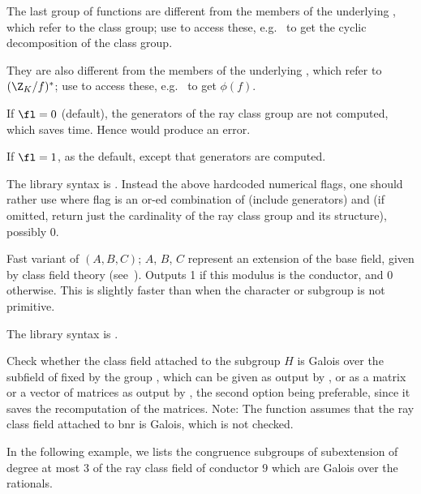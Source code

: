 The last group of functions are different from the members of the underlying
, which refer to the class group; use 
to access these, e.g.~ to get the cyclic decomposition
of the class group.

They are also different from the members of the underlying , which
refer to $(\Z_K/f)^*$; use  to access these,
e.g.~ to get $\phi(f)$.

If $\fl=0$ (default), the generators of the ray class group are not computed,
which saves time. Hence  would produce an error.

If $\fl=1$, as the default, except that generators are computed.

The library syntax is .
Instead the above  hardcoded  numerical flags,  one should rather use
where flag is an or-ed combination of  (include generators)
and  (if omitted, return just the cardinality of the ray class
group and its structure), possibly 0.

\label{se:bnrisconductor}
Fast variant of $(A,B,C)$; $A$, $B$, $C$ represent
an extension of the base field, given by class field theory
(see~). Outputs 1 if this modulus is the conductor, and 0
otherwise. This is slightly faster than  when the
character or subgroup is not primitive.

The library syntax is .

\label{se:bnrisgalois}
Check whether the class field attached to the subgroup $H$ is Galois
over the subfield of  fixed by the group , which can be
given as output by , or as a matrix or a vector of matrices as
output by , the second option being preferable, since it
saves the recomputation of the matrices.  Note: The function assumes that the
ray class field attached to bnr is Galois, which is not checked.

In the following example, we lists the congruence subgroups of subextension of
degree at most $3$ of the ray class field of conductor $9$ which are Galois
over the rationals.

